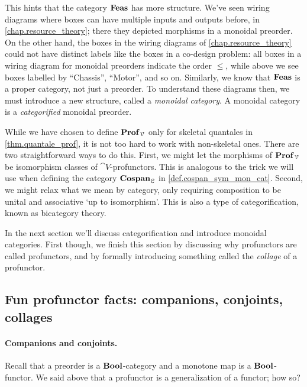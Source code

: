 \documentclass[7Sketches]{subfiles}
\begin{document}
This hints that the category $\mathbf{Feas}$ has more structure. We've seen wiring
diagrams where boxes can have multiple inputs and outputs before, in
\cref{chap.resource_theory}; there they depicted morphisms in a monoidal
preorder. On the other hand, the boxes in the wiring diagrams of
\cref{chap.resource_theory} could not have distinct labels like the boxes in a
co-design problem: all boxes in a wiring diagram for monoidal preorders indicate
the order $\le$, while above we see boxes labelled by ``Chassis'', ``Motor'',
and so on. Similarly, we know that $\mathbf{Feas}$ is a proper category, not just a
preorder. To understand these diagrams then, we must introduce a new structure,
called a \emph{monoidal category}. A monoidal category is a \emph{categorified}
monoidal preorder. 


\begin{remark}%
While we have chosen to define $\mathbf{Prof}_{\mathcal{V}}$ only for skeletal quantales in
\cref{thm.quantale_prof}, it is not too hard to work with non-skeletal ones.
There are two straightforward ways to do this. First, we might let the morphisms
of $\mathbf{Prof}_{\mathcal{V}}$ be isomorphism classes of $\cat{V}$-profunctors. This is
analogous to the trick we will use when defining the category $\mathbf{Cospan}_{\mathcal{C}}$
in \cref{def.cospan_sym_mon_cat}.  Second, we might relax what we mean by
category, only requiring composition to be unital and associative `up to
isomorphism'. This is also a type of categorification, known as bicategory theory.%
%
%
\end{remark}

In the next section we'll discuss categorification and introduce monoidal
categories. First though, we finish this section by discussing why profunctors
are called profunctors, and by formally introducing something called the \emph{collage} of a profunctor.

%

\subsection{Fun profunctor facts: companions, conjoints, collages}


\paragraph{Companions and conjoints.}
Recall that a preorder is a $\mathbf{Bool}$-category and a monotone map is a $\mathbf{Bool}$-functor. We said above that a profunctor is a generalization of a functor; how so?
\end{document}

